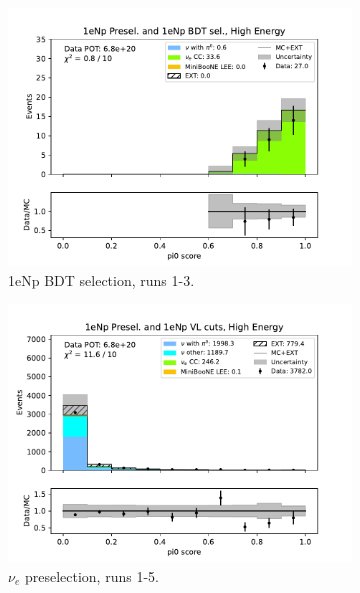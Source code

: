 \begin{figure}[H]
\begin{subfigure}{0.33\linewidth}
    \includegraphics[width=\linewidth]{technote/Sidebands/Figures/FarSideband/far_sideband_pi0_score_run123_NP_NPBDT_HIGH_ENERGY.pdf}
    \caption{1eNp BDT selection, runs 1-3.}
    \end{subfigure}
    \begin{subfigure}{0.33\linewidth}
    \includegraphics[width=\linewidth]{technote/Sidebands/Figures/FarSideband/far_sideband_pi0_score_run123_NP_NP_HIGH_ENERGY.pdf}
    \caption{$\nu_e$ preselection, runs 1-5.}
    \end{subfigure}%
    \begin{subfigure}{0.33\linewidth}

\end{subfigure}
\end{figure}
